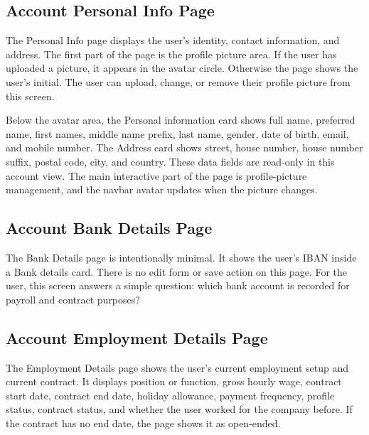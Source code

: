 \documentclass[11pt]{article}
\begin{document}
\subsection{Account Personal Info Page}

The Personal Info page displays the user's identity, contact information, and address. The first part of the page is the profile picture area. If the user has uploaded a picture, it appears in the avatar circle. Otherwise the page shows the user's initial. The user can upload, change, or remove their profile picture from this screen.

Below the avatar area, the Personal information card shows full name, preferred name, first names, middle name prefix, last name, gender, date of birth, email, and mobile number. The Address card shows street, house number, house number suffix, postal code, city, and country. These data fields are read-only in this account view. The main interactive part of the page is profile-picture management, and the navbar avatar updates when the picture changes.

\subsection{Account Bank Details Page}

The Bank Details page is intentionally minimal. It shows the user's IBAN inside a Bank details card. There is no edit form or save action on this page. For the user, this screen answers a simple question: which bank account is recorded for payroll and contract purposes?

\subsection{Account Employment Details Page}

The Employment Details page shows the user's current employment setup and current contract. It displays position or function, gross hourly wage, contract start date, contract end date, holiday allowance, payment frequency, profile status, contract status, and whether the user worked for the company before. If the contract has no end date, the page shows it as open-ended.
\end{document}

